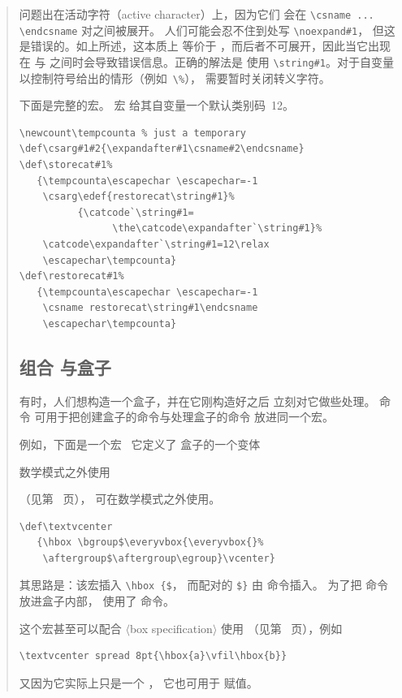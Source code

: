 \documentclass[a4paper]{rapport3}
\def\gr#1{$\langle$#1$\rangle$}\def\key#1{{\tt#1}}
\newenvironment{disp}{\begin{quotation}}{\end{quotation}}
\def\howto#1\par{}
\begin{document}
\begin{disp}
问题出在活动字符（active character）上，因为它们
会在 \verb>\csname ... \endcsname> 对之间被展开。
人们可能会忍不住到处写 \verb>\noexpand#1>，
但这是错误的。如上所述，这本质上
等价于 ，而后者不可展开，因此当它出现在
 与  之间时会导致错误信息。正确的解法是
使用 \verb>\string#1>。对于自变量以控制符号给出的情形（例如~\verb>\%>），
需要暂时关闭转义字符。

下面是完整的宏。 宏
给其自变量一个默认类别码~12。
\begin{verbatim}
\newcount\tempcounta % just a temporary
\def\csarg#1#2{\expandafter#1\csname#2\endcsname}
\def\storecat#1%
   {\tempcounta\escapechar \escapechar=-1
    \csarg\edef{restorecat\string#1}%
          {\catcode`\string#1=
                \the\catcode\expandafter`\string#1}%
    \catcode\expandafter`\string#1=12\relax
    \escapechar\tempcounta}
\def\restorecat#1%
   {\tempcounta\escapechar \escapechar=-1
    \csname restorecat\string#1\endcsname
    \escapechar\tempcounta}
\end{verbatim}

\subsection{组合  与盒子}

有时，人们想构造一个盒子，并在它刚构造好之后
立刻对它做些处理。 命令
可用于把创建盒子的命令与处理盒子的命令
放进同一个宏。

例如，下面是一个宏 \label{text:vcenter}\
它定义了  盒子的一个变体
\howto 在数学模式之外使用 \par
（见第~\pageref{vcenter} 页\label{tvcenter}），
可在数学模式之外使用。
\begin{verbatim}
\def\textvcenter
   {\hbox \bgroup$\everyvbox{\everyvbox{}%
    \aftergroup$\aftergroup\egroup}\vcenter}
\end{verbatim}
其思路是：该宏插入 \verb>\hbox {$>，
而配对的 \verb>$}> 由  命令插入。
为了把 \cs{aftergroup} 命令放进盒子内部，
使用了  命令。

这个宏甚至可以配合 \gr{box specification} 使用
（见第~\pageref{box:spec} 页），例如
\begin{verbatim}
\textvcenter spread 8pt{\hbox{a}\vfil\hbox{b}}
\end{verbatim}
又因为它实际上只是一个 ，
它也可用于  赋值。


\end{disp}
\end{document}
